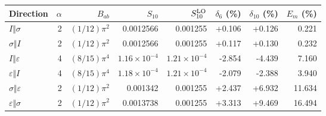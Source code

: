 \begin{tabular}{lrrrrrrr}\toprule
Direction & $\alpha$ & $B_{ab}$ & $S_{10}$ & $S_{10}^{\rm LO}$ & $\delta_6$ (\%) & $\delta_{10}$ (\%) & $E_m$ (\%)\\\midrule
$I\Vert \sigma$ & 2 & $(1/12)\pi^{2}$ & 0.0012566 & 0.001255 & +0.106 & +0.126 & 0.221\\
$\sigma\Vert I$ & 2 & $(1/12)\pi^{2}$ & 0.0012566 & 0.001255 & +0.117 & +0.130 & 0.232\\
$I\Vert \varepsilon$ & 4 & $(8/15)\pi^{4}$ & $1.16\!\times\!10^{-4}$ & $1.21\!\times\!10^{-4}$ & -2.854 & -4.439 & 7.160\\
$\varepsilon\Vert I$ & 4 & $(8/15)\pi^{4}$ & $1.18\!\times\!10^{-4}$ & $1.21\!\times\!10^{-4}$ & -2.079 & -2.388 & 3.940\\
$\sigma\Vert \varepsilon$ & 2 & $(1/12)\pi^{2}$ & 0.001342 & 0.001255 & +2.437 & +6.932 & 11.634\\
$\varepsilon\Vert \sigma$ & 2 & $(1/12)\pi^{2}$ & 0.0013738 & 0.001255 & +3.313 & +9.469 & 16.494\\
\bottomrule\end{tabular}
